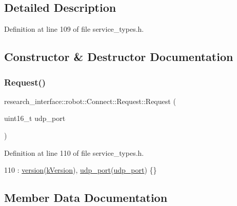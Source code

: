 \subsection{Detailed Description}


Definition at line 109 of file service\+\_\+types.\+h.



\subsection{Constructor \& Destructor Documentation}
\mbox{\label{structresearch__interface_1_1robot_1_1Connect_1_1Request_a6a37ef382008c0c62d216511aa17fd1c}} 
\subsubsection{\texorpdfstring{Request()}{Request()}}
{\footnotesize\ttfamily research\+\_\+interface\+::robot\+::\+Connect\+::\+Request\+::\+Request (\begin{DoxyParamCaption}\item[{uint16\+\_\+t}]{udp\+\_\+port }\end{DoxyParamCaption})\hspace{0.3cm}{\ttfamily [inline]}}



Definition at line 110 of file service\+\_\+types.\+h.


\begin{DoxyCode}
110 : \hyperlink{structresearch__interface_1_1robot_1_1Connect_1_1Request_a006e8004379eb2b329bb9388c76a5399}{version}(\hyperlink{namespaceresearch__interface_1_1robot_ab5e6cd0268270dc6e0adea0eb333b5df}{kVersion}), \hyperlink{structresearch__interface_1_1robot_1_1Connect_1_1Request_acb5f441cd6972e37a8a18e5b579b079a}{udp\_port}(\hyperlink{structresearch__interface_1_1robot_1_1Connect_1_1Request_acb5f441cd6972e37a8a18e5b579b079a}{udp\_port}) \{\}
\end{DoxyCode}


\subsection{Member Data Documentation}
\mbox{\label{structresearch__interface_1_1robot_1_1Connect_1_1Request_acb5f441cd6972e37a8a18e5b579b079a}} 
